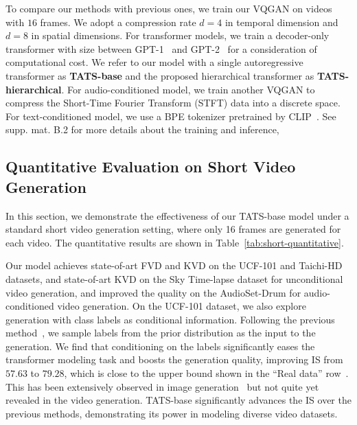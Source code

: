  To compare our methods with previous ones, we train our VQGAN on videos with $16$ frames. We adopt a compression rate $d=4$ in temporal dimension and $d=8$ in spatial dimensions. For transformer models, we train a decoder-only transformer with size between GPT-1~\cite{radford2018improving} and GPT-2~\cite{radford2019language} for a consideration of computational cost. We refer to our model with a single autoregressive transformer as \textbf{TATS-base} and the proposed hierarchical transformer as \textbf{TATS-hierarchical}. For audio-conditioned model, we train another VQGAN to compress the Short-Time Fourier Transform (STFT) data into a discrete space. For text-conditioned model, we use a BPE tokenizer pretrained by CLIP~\cite{radford2021learning}. See 
supp. mat. B.2 for more details about the training and inference, 

\subsection{Quantitative Evaluation on Short Video Generation}


In this section, we demonstrate the effectiveness of our TATS-base model under a standard short video generation setting, where only 16 frames are generated for each video. The quantitative results are shown in Table~\ref{tab:short-quantitative}.

Our model achieves state-of-art FVD and KVD on the UCF-101 and Taichi-HD datasets, and state-of-art KVD on the Sky Time-lapse dataset for unconditional video generation, and improved the quality on the AudioSet-Drum for audio-conditioned video generation. 
On the UCF-101 dataset, we also explore generation with class labels as conditional information. Following the previous method~\cite{saito2017temporal}, we sample labels from the prior distribution as the input to the generation. We find that conditioning on the labels significantly eases the transformer modeling task and boosts the generation quality, improving IS from $57.63$ to $79.28$, which is close to the upper bound shown in the ``Real data'' row~\cite{acharya2018towards,kahembwe2020lower}. This has been extensively observed in image generation~\cite{brock2018large,esser2021taming} but not quite yet revealed in the video generation.
TATS-base significantly advances the IS over the previous methods, demonstrating its power in modeling diverse video datasets.


